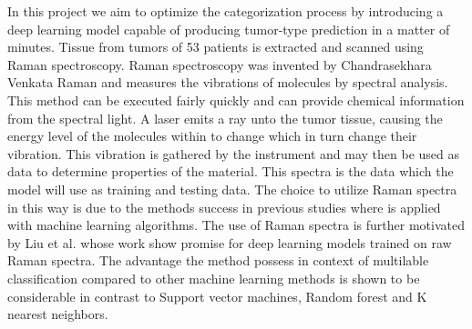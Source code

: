In this project we aim to optimize the categorization process by introducing a deep learning model capable of producing tumor-type prediction in a matter of minutes. Tissue from tumors of 53 patients is extracted and scanned using Raman spectroscopy. Raman spectroscopy was invented by Chandrasekhara Venkata Raman and measures the vibrations of molecules by spectral analysis. This method can be executed fairly quickly and can provide chemical information from the spectral light. A laser emits a ray unto the tumor tissue, causing the energy level of the molecules within to change which in turn change their vibration. This vibration is gathered by the instrument and may then be used as data to determine properties of the material\cite{long1977raman}\cite{graves1989practical}. This spectra is the data which the model will use as training and testing data. The choice to utilize Raman spectra in this way is due to the methods success in previous studies where is applied with machine learning algorithms\cite{ramanDL}\cite{ho2019rapid}. The use of Raman spectra is further motivated by Liu et al.\cite{liu2017deep} whose work show promise for deep learning models trained on raw Raman spectra. The advantage the method possess in context of multilable classification compared to other machine learning methods is shown to be considerable in contrast to Support vector machines, Random forest and K nearest neighbors\cite{liu2017deep}.